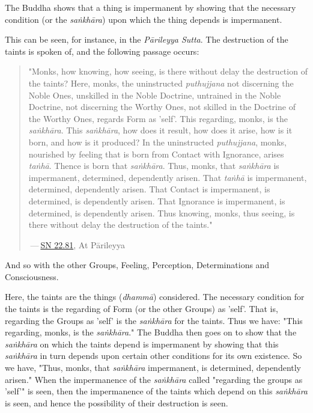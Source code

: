 The Buddha shows that a thing is impermanent by showing that the
necessary condition (or the \emph{saṅkhāra}) upon which the thing depends
is impermanent.


This can be seen, for instance, in the \emph{Pārileyya Sutta}.
The destruction of the taints is spoken of, and the following passage occurs:


\begin{quotation}
"Monks, how knowing, how seeing, is there without delay the destruction
of the taints? Here, monks, the uninstructed \emph{puthujjana} not
discerning the Noble Ones, unskilled in the Noble Doctrine, untrained in
the Noble Doctrine, not discerning the Worthy Ones, not skilled in the
Doctrine of the Worthy Ones, regards Form as 'self'. This regarding,
monks, is the \emph{saṅkhāra}. This \emph{saṅkhāra}, how does it result, how
does it arise, how is it born, and how is it produced? In the
uninstructed \emph{puthujjana}, monks, nourished by feeling that is born
from Contact with Ignorance, arises \emph{taṅhā}. Thence is born that
\emph{saṅkhāra}. Thus, monks, that \emph{saṅkhāra} is impermanent, determined,
dependently arisen. That \emph{taṅhā} is impermanent, determined, dependently
arisen. That Contact is impermanent, is determined, is dependently
arisen. That Ignorance is impermanent, is determined, is dependently
arisen. Thus knowing, monks, thus seeing, is there without delay the
destruction of the taints."


 — \href{https://suttacentral.net/sn22.81/en/bodhi}{SN 22.81}, At Pārileyya


\end{quotation}

And so with the other Groups, Feeling, Perception, Determinations and
Consciousness.


Here, the taints are the things (\emph{dhammā}) considered. The necessary
condition for the taints is the regarding of Form (or the other Groups)
as 'self'. That is, regarding the Groups as 'self' is the \emph{saṅkhāra} for
the taints. Thus we have: "This regarding, monks, is the \emph{saṅkhāra}."
The Buddha then goes on to show that the \emph{saṅkhāra} on which the taints
depend is impermanent by showing that this \emph{saṅkhāra} in turn depends
upon certain other conditions for its own existence. So we have, "Thus,
monks, that \emph{saṅkhāra} impermanent, is determined, dependently arisen."
When the impermanence of the \emph{saṅkhāra} called "regarding the groups as
'self'" is seen, then the impermanence of the taints which depend on
this \emph{saṅkhāra} is seen, and hence the possibility of their destruction
is seen.


